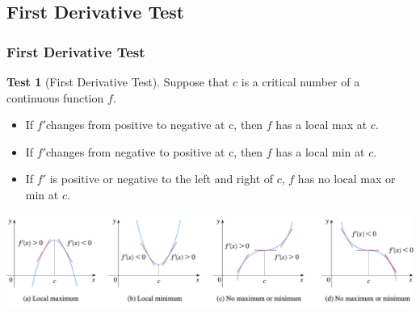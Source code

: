 \documentclass[t]{beamer}
\theoremstyle{plain}
\theoremstyle{definition}
\newtheorem{test}{Test}
\begin{document}
\subsection{First Derivative Test}
\begin{frame}
\frametitle{First Derivative Test}
\footnotesize
\begin{test}[First Derivative Test]
Suppose that $c$ is a critical number of a continuous function $f$.
	\begin{itemize}
		\item If $f'$changes from positive to negative at c, then $f$ has a local max at $c$.
		\item If $f'$changes from negative to positive at c, then $f$ has a local min at $c$.
		\item If $f'$ is positive or negative to the left and right of $c$, $f$ has no local max or min at $c$.
	\end{itemize}
\end{test}

\vspace{1em}
\centering
\includegraphics[scale=0.27]{fig/firsttest}

\end{frame}
\end{document}
